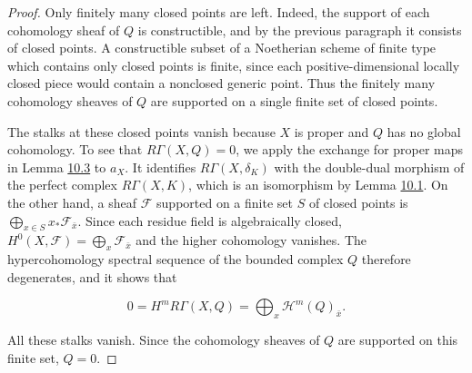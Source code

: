 \documentclass[11pt]{article}
\begin{document}
\begin{proof}[{Proof}]
Only finitely many closed points are left. Indeed, the support of each cohomology sheaf of \(Q\) is constructible, and by the previous paragraph it consists of closed points. A constructible subset of a Noetherian scheme of finite type which contains only closed points is finite, since each positive-dimensional locally closed piece would contain a nonclosed generic point. Thus the finitely many cohomology sheaves of \(Q\) are supported on a single finite set of closed points.

The stalks at these closed points vanish because \(X\) is proper and \(Q\) has no global cohomology. To see that \(R\Gamma(X,Q)=0\), we apply the exchange for proper maps in Lemma \hyperref[bp10]{10.3} to \(a_X\). It identifies \(R\Gamma(X,\delta_K)\) with the double-dual morphism of the perfect complex \(R\Gamma(X,K)\), which is an isomorphism by Lemma \hyperref[bp5]{10.1}. On the other hand, a sheaf \(\mathcal F\) supported on a finite set \(S\) of closed points is \(\bigoplus_{x\in S}x_*\mathcal F_{\bar x}\). Since each residue field is algebraically closed, \(H^0(X,\mathcal F)=\bigoplus_x
\mathcal F_{\bar x}\) and the higher cohomology vanishes. The hypercohomology spectral sequence of the bounded complex \(Q\) therefore degenerates, and it shows that

\[
0=H^mR\Gamma(X,Q)
=\bigoplus_x\mathcal H^m(Q)_{\bar x}.
\]

All these stalks vanish. Since the cohomology sheaves of \(Q\) are supported on this finite set, \(Q=0\).


\end{proof}
\end{document}
